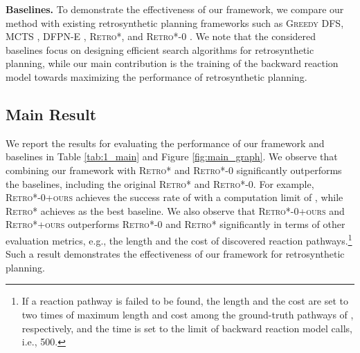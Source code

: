 \textbf{Baselines.}
To demonstrate the effectiveness of our framework, we compare our method with existing retrosynthetic planning frameworks such as \textsc{Greedy DFS}, \textsc{MCTS} \cite{segler2018planning}, \textsc{DFPN-E} \cite{kishimoto2019depth}, \textsc{Retro*}, and \textsc{Retro*-0} \cite{chen2020retro}. We note that the considered baselines focus on designing efficient search algorithms for retrosynthetic planning, while our main contribution is the training of the backward reaction model towards maximizing the performance of retrosynthetic planning. 





\subsection{Main Result}
We report the results for evaluating the performance of our framework and baselines in Table \ref{tab:1_main} and Figure \ref{fig:main_graph}. We observe that combining our framework with \textsc{Retro*} and \textsc{Retro*-0} significantly outperforms the baselines, including the original \textsc{Retro*} and \textsc{Retro*-0}. For example, \textsc{Retro*-0+ours} achieves the success rate of  with a computation limit of , while \textsc{Retro*} achieves  as the best baseline. We also observe that \textsc{Retro*-0+ours} and \textsc{Retro*+ours} outperforms \textsc{Retro*-0} and \textsc{Retro*} significantly in terms of other evaluation metrics, e.g., the length and the cost of discovered reaction pathways.\footnote{If a reaction pathway is failed to be found, the length and the cost are set to two times of maximum length and cost among the ground-truth pathways of , respectively, and the time is set to the limit of backward reaction model calls, i.e., 500.} Such a result demonstrates the effectiveness of our framework for retrosynthetic planning. 

